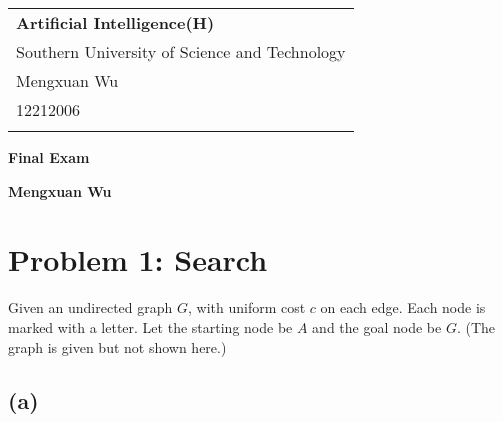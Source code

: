 \documentclass[a4paper,12pt]{article}
\begin{document}



\thispagestyle{empty} %

\begin{tabular}{p{15.5cm}}
{\large \bf Artificial Intelligence(H)} \\
Southern University of Science and Technology \\ Mengxuan Wu \\ 12212006 \\
\hline
\\
\end{tabular}

\vspace*{0.3cm} %

\begin{center}
	{\Large \bf Final Exam}
	\vspace{2mm}

	{\bf Mengxuan Wu}
		
\end{center}  

\vspace{0.4cm}

\section*{Problem 1: Search}

Given an undirected graph $G$, with uniform cost $c$ on each edge. Each node is marked with a letter. Let the starting node be $A$ and the goal node be $G$. (The graph is given but not shown here.)

\subsection*{(a)}
\end{document}
